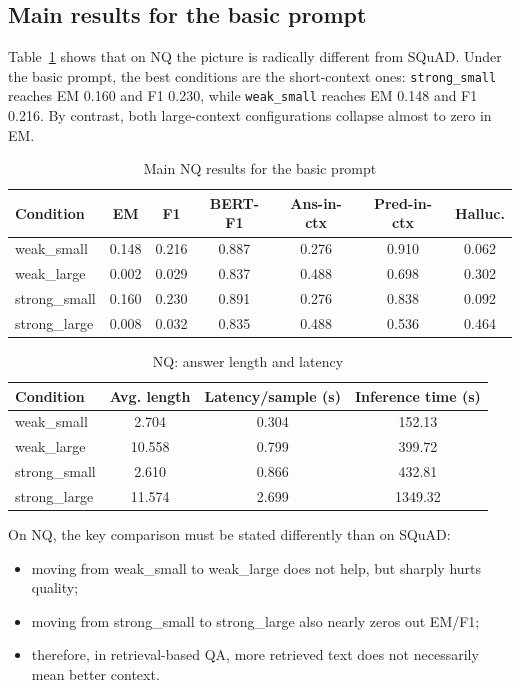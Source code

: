 \documentclass[a4paper,12pt]{article}
\begin{document}
\subsection{Main results for the basic prompt}
Table~\ref{tab:nq_basic} shows that on NQ the picture is radically different from SQuAD. Under the basic prompt, the best conditions are the short-context ones: \texttt{strong\_small} reaches EM 0.160 and F1 0.230, while \texttt{weak\_small} reaches EM 0.148 and F1 0.216. By contrast, both large-context configurations collapse almost to zero in EM.
\begin{table}[H]
\centering
\caption{Main NQ results for the basic prompt}
\label{tab:nq_basic}
\begin{tabular}{|l|c|c|c|c|c|c|}
\hline
Condition & EM & F1 & BERT-F1 & Ans-in-ctx & Pred-in-ctx & Halluc. \\
\hline
weak\_small & 0.148 & 0.216 & 0.887 & 0.276 & 0.910 & 0.062 \\
weak\_large & 0.002 & 0.029 & 0.837 & 0.488 & 0.698 & 0.302 \\
strong\_small & 0.160 & 0.230 & 0.891 & 0.276 & 0.838 & 0.092 \\
strong\_large & 0.008 & 0.032 & 0.835 & 0.488 & 0.536 & 0.464 \\
\hline
\end{tabular}
\end{table}

\begin{table}[H]
\centering
\caption{NQ: answer length and latency}
\begin{tabular}{|l|c|c|c|}
\hline
Condition & Avg. length & Latency/sample (s) & Inference time (s) \\
\hline
weak\_small & 2.704 & 0.304 & 152.13 \\
weak\_large & 10.558 & 0.799 & 399.72 \\
strong\_small & 2.610 & 0.866 & 432.81 \\
strong\_large & 11.574 & 2.699 & 1349.32 \\
\hline
\end{tabular}
\end{table}

On NQ, the key comparison must be stated differently than on SQuAD:
\begin{itemize}
    \item moving from weak\_small to weak\_large does not help, but sharply hurts quality;
    \item moving from strong\_small to strong\_large also nearly zeros out EM/F1;
    \item therefore, in retrieval-based QA, more retrieved text does not necessarily mean better context.
\end{itemize}
\end{document}
